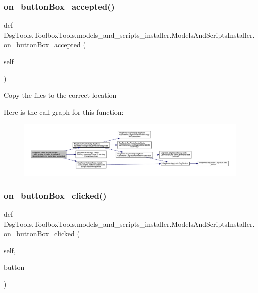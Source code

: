 \subsubsection{\texorpdfstring{on\+\_\+button\+Box\+\_\+accepted()}{on\_buttonBox\_accepted()}}
{\footnotesize\ttfamily def Dsg\+Tools.\+Toolbox\+Tools.\+models\+\_\+and\+\_\+scripts\+\_\+installer.\+Models\+And\+Scripts\+Installer.\+on\+\_\+button\+Box\+\_\+accepted (\begin{DoxyParamCaption}\item[{}]{self }\end{DoxyParamCaption})}

\begin{DoxyVerb}Copy the files to the correct location
\end{DoxyVerb}
 Here is the call graph for this function\+:
\nopagebreak
\begin{figure}[H]
\begin{center}
\leavevmode
\includegraphics[width=350pt]{class_dsg_tools_1_1_toolbox_tools_1_1models__and__scripts__installer_1_1_models_and_scripts_installer_a97fded3f1030267541e352808d1f4d21_cgraph}
\end{center}
\end{figure}
\mbox{\label{class_dsg_tools_1_1_toolbox_tools_1_1models__and__scripts__installer_1_1_models_and_scripts_installer_aefe84b09fc3e64c71e1d346499617f6b}} 
\subsubsection{\texorpdfstring{on\+\_\+button\+Box\+\_\+clicked()}{on\_buttonBox\_clicked()}}
{\footnotesize\ttfamily def Dsg\+Tools.\+Toolbox\+Tools.\+models\+\_\+and\+\_\+scripts\+\_\+installer.\+Models\+And\+Scripts\+Installer.\+on\+\_\+button\+Box\+\_\+clicked (\begin{DoxyParamCaption}\item[{}]{self,  }\item[{}]{button }\end{DoxyParamCaption})}

